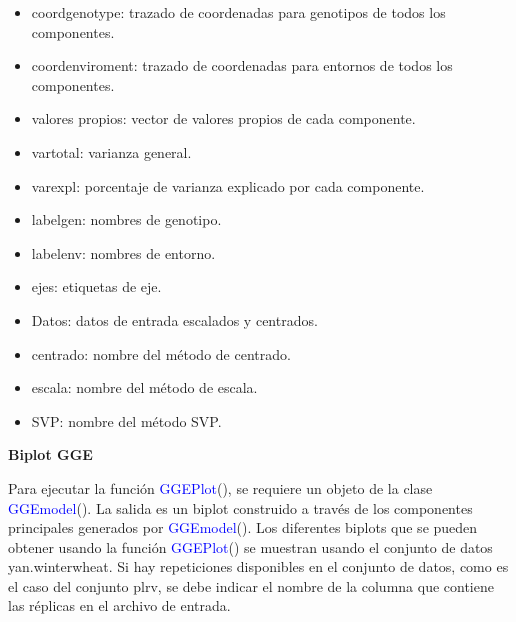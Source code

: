 \begin{itemize}[wide, nosep, labelindent = 0pt, topsep = 1ex]
\item coordgenotype: trazado de coordenadas para genotipos de todos los componentes.
\item coordenviroment: trazado de coordenadas para entornos de todos los componentes.
\item valores propios: vector de valores propios de cada componente.
\item vartotal: varianza general.
\item varexpl: porcentaje de varianza explicado por cada componente.
\item labelgen: nombres de genotipo.
\item labelenv: nombres de entorno.
\item ejes: etiquetas de eje.
\item Datos: datos de entrada escalados y centrados.
\item centrado: nombre del método de centrado.
\item escala: nombre del método de escala.
\item SVP: nombre del método SVP.
\end{itemize}

\textbf{Biplot GGE}

Para ejecutar la función \textcolor{blue}{GGEPlot}(), se requiere un objeto de la clase \textcolor{blue}{GGEmodel}(). La salida es un biplot construido a través de los componentes principales generados por \textcolor{blue}{GGEmodel}().
Los diferentes biplots que se pueden obtener usando la función \textcolor{blue}{GGEPlot}() se muestran usando el conjunto de datos yan.winterwheat. Si hay repeticiones disponibles en el conjunto de datos, como es el caso del conjunto plrv, se debe indicar el nombre de la columna que contiene las réplicas en el archivo de entrada.

